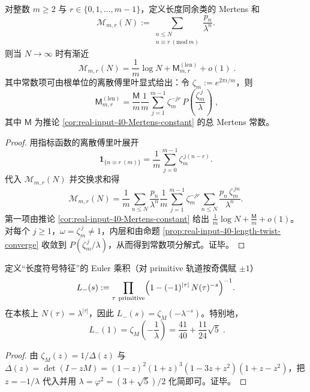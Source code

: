 \begin{theorem}\label{thm:real-input-40-length-mertens-prog}
对整数 \(m\ge 2\) 与 \(r\in\{0,1,\dots,m-1\}\)，定义长度同余类的 Mertens 和
\[
\mathcal{M}_{m,r}(N):=\sum_{\substack{n\le N\\ n\equiv r\ (\mathrm{mod}\ m)}}\frac{p_n}{\lambda^n}.
\]
则当 \(N\to\infty\) 时有渐近
\[
\boxed{\;
\mathcal{M}_{m,r}(N)=\frac{1}{m}\log N+\mathsf{M}^{(\mathrm{len})}_{m,r}+o(1)\; }.
\]
其中常数项可由根单位的离散傅里叶显式给出：令 \(\zeta_m:=e^{2\pi i/m}\)，则
\[
\boxed{\;
\mathsf{M}^{(\mathrm{len})}_{m,r}
=\frac{\mathsf{M}}{m}
\frac{1}{m}\sum_{j=1}^{m-1}\zeta_m^{-jr}\,P\!\left(\frac{\zeta_m^{\,j}}{\lambda}\right)\; },
\]
其中 \(\mathsf{M}\) 为推论 \ref{cor:real-input-40-Mertens-constant} 的总 Mertens 常数。
\end{theorem}
\begin{proof}
用指标函数的离散傅里叶展开
\[
\mathbf{1}_{\{n\equiv r\ (m)\}}
=\frac{1}{m}\sum_{j=0}^{m-1}\zeta_m^{\,j(n-r)}.
\]
代入 \(\mathcal{M}_{m,r}(N)\) 并交换求和得
\[
\mathcal{M}_{m,r}(N)
=\frac{1}{m}\sum_{n\le N}\frac{p_n}{\lambda^n}
\frac{1}{m}\sum_{j=1}^{m-1}\zeta_m^{-jr}\sum_{n\le N}\frac{p_n\,\zeta_m^{\,jn}}{\lambda^n}.
\]
第一项由推论 \ref{cor:real-input-40-Mertens-constant} 给出
\(
\frac{1}{m}\log N+\frac{\mathsf{M}}{m}+o(1)
\)。
对每个 \(j\ge 1\)，\(\omega=\zeta_m^{\,j}\neq 1\)，内层和由命题 \ref{prop:real-input-40-length-twist-converge} 收敛到 \(P(\zeta_m^{\,j}/\lambda)\)，从而得到常数项分解式。证毕。
\end{proof}

\begin{corollary}\label{cor:real-input-40-length-sign-L1}
定义“长度符号特征”的 Euler 乘积（对 primitive 轨道按奇偶赋 \(\pm 1\)）
\[
L_-(s):=\prod_{\tau\ \mathrm{primitive}}\Bigl(1-(-1)^{|\tau|}\,N(\tau)^{-s}\Bigr)^{-1}.
\]
在本核上 \(N(\tau)=\lambda^{|\tau|}\)，因此 \(L_-(s)=\zeta_M(-\lambda^{-s})\)。特别地，
\[
\boxed{\;
L_-(1)=\zeta_M\!\left(-\frac{1}{\lambda}\right)
=\frac{41}{40}+\frac{11}{24}\sqrt5\; }.
\]
\end{corollary}
\begin{proof}
由 \(\zeta_M(z)=1/\Delta(z)\) 与 \(\Delta(z)=\det(I-zM)=(1-z)^2(1+z)^3(1-3z+z^2)(1+z-z^2)\)，把 \(z=-1/\lambda\) 代入并用 \(\lambda=\varphi^2=(3+\sqrt5)/2\) 化简即可。证毕。
\end{proof}

